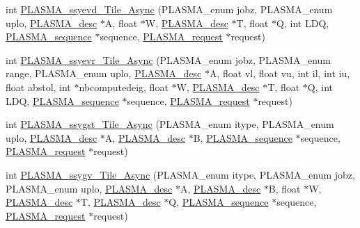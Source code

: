 \begin{DoxyCompactItemize}
int \hyperlink{group__float__Tile__Async_gace8db2bf803edf81b914362fe8ef9c9f_gace8db2bf803edf81b914362fe8ef9c9f}{P\+L\+A\+S\+M\+A\+\_\+ssyevd\+\_\+\+Tile\+\_\+\+Async} (P\+L\+A\+S\+M\+A\+\_\+enum jobz, P\+L\+A\+S\+M\+A\+\_\+enum uplo, \hyperlink{structplasma__desc__t}{P\+L\+A\+S\+M\+A\+\_\+desc} $\ast$A, float $\ast$W, \hyperlink{structplasma__desc__t}{P\+L\+A\+S\+M\+A\+\_\+desc} $\ast$T, float $\ast$Q, int L\+D\+Q, \hyperlink{structplasma__sequence__t}{P\+L\+A\+S\+M\+A\+\_\+sequence} $\ast$sequence, \hyperlink{structplasma__request__t}{P\+L\+A\+S\+M\+A\+\_\+request} $\ast$request)
\item 
int \hyperlink{group__float__Tile__Async_gaed935568555dff5c9f8cf4f5eb18612d_gaed935568555dff5c9f8cf4f5eb18612d}{P\+L\+A\+S\+M\+A\+\_\+ssyevr\+\_\+\+Tile\+\_\+\+Async} (P\+L\+A\+S\+M\+A\+\_\+enum jobz, P\+L\+A\+S\+M\+A\+\_\+enum range, P\+L\+A\+S\+M\+A\+\_\+enum uplo, \hyperlink{structplasma__desc__t}{P\+L\+A\+S\+M\+A\+\_\+desc} $\ast$A, float vl, float vu, int il, int iu, float abstol, int $\ast$nbcomputedeig, float $\ast$W, \hyperlink{structplasma__desc__t}{P\+L\+A\+S\+M\+A\+\_\+desc} $\ast$T, float $\ast$Q, int L\+D\+Q, \hyperlink{structplasma__sequence__t}{P\+L\+A\+S\+M\+A\+\_\+sequence} $\ast$sequence, \hyperlink{structplasma__request__t}{P\+L\+A\+S\+M\+A\+\_\+request} $\ast$request)
\item 
int \hyperlink{group__float__Tile__Async_ga0ba80975dba7d12181f27baaae46c3eb_ga0ba80975dba7d12181f27baaae46c3eb}{P\+L\+A\+S\+M\+A\+\_\+ssygst\+\_\+\+Tile\+\_\+\+Async} (P\+L\+A\+S\+M\+A\+\_\+enum itype, P\+L\+A\+S\+M\+A\+\_\+enum uplo, \hyperlink{structplasma__desc__t}{P\+L\+A\+S\+M\+A\+\_\+desc} $\ast$A, \hyperlink{structplasma__desc__t}{P\+L\+A\+S\+M\+A\+\_\+desc} $\ast$B, \hyperlink{structplasma__sequence__t}{P\+L\+A\+S\+M\+A\+\_\+sequence} $\ast$sequence, \hyperlink{structplasma__request__t}{P\+L\+A\+S\+M\+A\+\_\+request} $\ast$request)
\item 
int \hyperlink{group__float__Tile__Async_ga40eabad9bbb66303320e6fe3dbcf8d06_ga40eabad9bbb66303320e6fe3dbcf8d06}{P\+L\+A\+S\+M\+A\+\_\+ssygv\+\_\+\+Tile\+\_\+\+Async} (P\+L\+A\+S\+M\+A\+\_\+enum itype, P\+L\+A\+S\+M\+A\+\_\+enum jobz, P\+L\+A\+S\+M\+A\+\_\+enum uplo, \hyperlink{structplasma__desc__t}{P\+L\+A\+S\+M\+A\+\_\+desc} $\ast$A, \hyperlink{structplasma__desc__t}{P\+L\+A\+S\+M\+A\+\_\+desc} $\ast$B, float $\ast$W, \hyperlink{structplasma__desc__t}{P\+L\+A\+S\+M\+A\+\_\+desc} $\ast$T, \hyperlink{structplasma__desc__t}{P\+L\+A\+S\+M\+A\+\_\+desc} $\ast$Q, \hyperlink{structplasma__sequence__t}{P\+L\+A\+S\+M\+A\+\_\+sequence} $\ast$sequence, \hyperlink{structplasma__request__t}{P\+L\+A\+S\+M\+A\+\_\+request} $\ast$request)

\end{DoxyCompactItemize}
